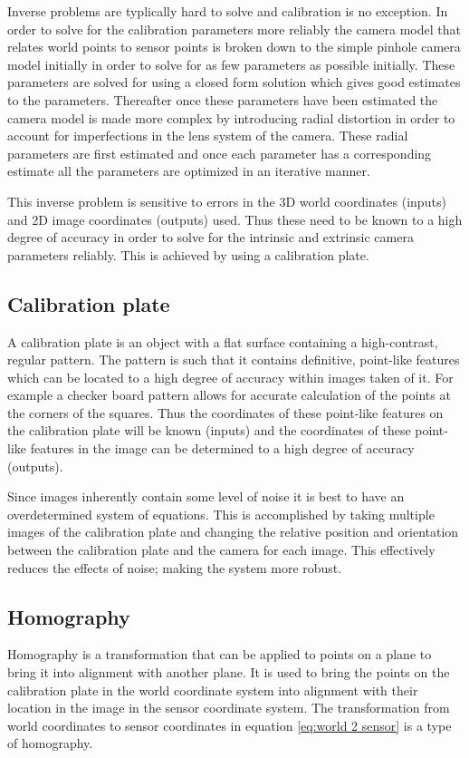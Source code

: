 Inverse problems are typlically hard to solve and calibration is no exception. In order to solve for the calibration parameters more reliably the camera model that relates world points to sensor points is broken down to the simple pinhole camera model initially in order to solve for as few parameters as possible initially. These parameters are solved for using a closed form solution which gives good estimates to the parameters. Thereafter once these parameters have been estimated the camera model is made more complex by introducing radial distortion in order to account for imperfections in the lens system of the camera. These radial parameters are first estimated and once each parameter has a corresponding estimate all the parameters are optimized in an iterative manner.

This inverse problem is sensitive to errors in the 3D world coordinates (inputs) and 2D image coordinates (outputs) used. Thus these need to be known to a high degree of accuracy in order to solve for the intrinsic and extrinsic camera parameters reliably. This is achieved by using a calibration plate.

\subsection{Calibration plate}
A calibration plate is an object with a flat surface containing a high-contrast, regular pattern. The pattern is such that it contains definitive, point-like features which can be located to a high degree of accuracy within images taken of it. For example a checker board pattern allows for accurate calculation of the points at the corners of the squares. Thus the coordinates of these point-like features on the calibration plate will be known (inputs) and the coordinates of these point-like features in the image can be determined to a high degree of accuracy (outputs).

Since images inherently contain some level of noise it is best to have an overdetermined system of equations. This is accomplished by taking multiple images of the calibration plate and changing the relative position and orientation between the calibration plate and the camera for each image. This effectively reduces the effects of noise; making the system more robust.

\subsection{Homography}
\label{sec: homography}
Homography is a transformation that can be applied to points on a plane to bring it into alignment with another plane. It is used to bring the points on the calibration plate in the world coordinate system into alignment with their location in the image in the sensor coordinate system. The transformation from world coordinates to sensor coordinates in equation \ref{eq:world 2 sensor} is a type of homography.

